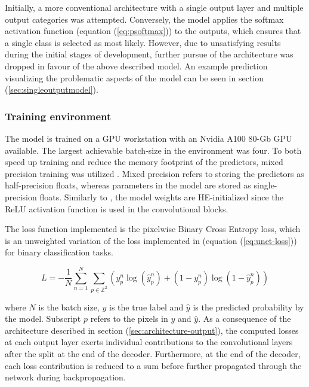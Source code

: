 \documentclass[../main/thesis]{subfiles}
\begin{document}
Initially, a more conventional architecture with a single output layer and multiple output categories \citep{Ronneberger2015} was attempted. Conversely, the model applies the softmax activation function (equation (\ref{eq:psoftmax})) to the outputs, which ensures that a single class is selected as most likely. However, due to unsatisfying results during the initial stages of development, further pursue of the architecture was dropped in favour of the above described model. An example prediction visualizing the problematic aspects of the model can be seen in section (\ref{sec:singleoutputmodel}). 


\subsubsection{Training environment}
\label{sec:train_env}
The model is trained on a GPU workstation with an Nvidia A100 80-Gb GPU available. The largest achievable batch-size in the environment was four. To both speed up training and reduce the memory footprint of the predictors, mixed precision training was utilized \citep{Micikevicius2017}. Mixed precision refers to storing the predictors as half-precision floats, whereas parameters in the model are stored as single-precision floats. Similarly to \citet{Ronneberger2015}, the model weights are HE-initialized \citep{He2015} since the ReLU activation function \citep{Nair2010} is used in the convolutional blocks.

The loss function implemented is the pixelwise Binary Cross Entropy loss, which is an unweighted variation of the loss implemented in \citep{Ronneberger2015} (equation (\ref{eq:unet-loss})) for binary classification tasks. 

\begin{equation}
    \label{eq:loss}
    L = -\frac{1}{N}\sum_{n = 1}^N\sum_{p \in \mathbb{Z}^2}\left(y_p^n\log{(\hat{y}_p^n)} + \left(1 - y_p^n\right)\log{(1 - \hat{y}_p^n)}\right)
\end{equation}

where $N$ is the batch size, $y$ is the true label and $\hat{y}$ is the predicted probability by the model. Subscript $p$ refers to the pixels in $y$ and $\hat{y}$. As a consequence of the architecture described in section (\ref{sec:architecture-output}), the computed losses at each output layer exerts individual contributions to the convolutional layers after the split at the end of the decoder. Furthermore, at the end of the decoder, each loss contribution is reduced to a sum before further propagated through the network during backpropagation.
\end{document}
